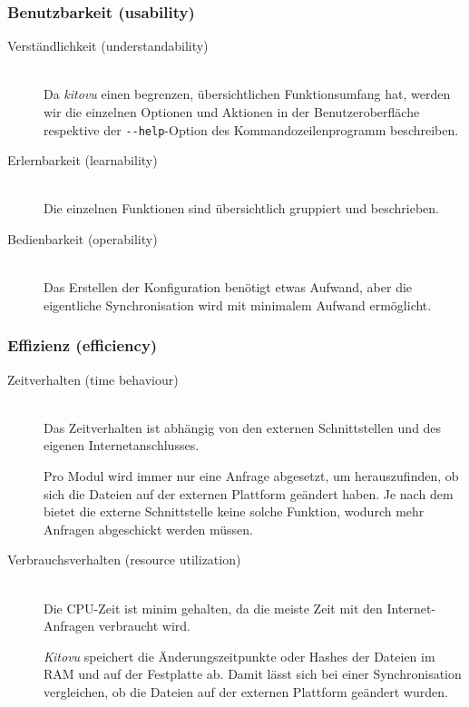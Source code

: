 \documentclass[a4paper]{article}
\begin{document}
\subsubsection{Benutzbarkeit (usability)}

\begin{description}
  \item[Verständlichkeit (understandability)] \strut \\
    Da \emph{kitovu} einen begrenzen, übersichtlichen Funktionsumfang hat, werden wir die einzelnen Optionen und Aktionen in der Benutzeroberfläche respektive der \verb|--help|-Option des Kommandozeilenprogramm beschreiben.
  \item[Erlernbarkeit (learnability)] \strut \\
    Die einzelnen Funktionen sind übersichtlich gruppiert und beschrieben.
  \item[Bedienbarkeit (operability)] \strut \\
    Das Erstellen der Konfiguration benötigt etwas Aufwand, aber die  eigentliche Synchronisation wird mit minimalem Aufwand ermöglicht.
\end{description}

\subsubsection{Effizienz (efficiency)}

\begin{description}
  \item[Zeitverhalten (time behaviour)] \strut \\
    Das Zeitverhalten ist abhängig von den externen Schnittstellen und des eigenen Internetanschlusses.

    Pro Modul wird immer nur eine Anfrage abgesetzt, um herauszufinden, ob sich die Dateien auf der externen Plattform geändert haben. Je nach dem bietet die externe Schnittstelle keine solche Funktion, wodurch mehr Anfragen abgeschickt werden müssen.
  \item[Verbrauchsverhalten (resource utilization)] \strut \\
    Die CPU-Zeit ist minim gehalten, da die meiste Zeit mit den Internet-Anfragen verbraucht wird.

    \emph{Kitovu} speichert die Änderungszeitpunkte oder Hashes der Dateien im RAM und auf der Festplatte ab. Damit lässt sich bei einer Synchronisation vergleichen, ob die Dateien auf der externen Plattform geändert wurden.
\end{description}
\end{document}
